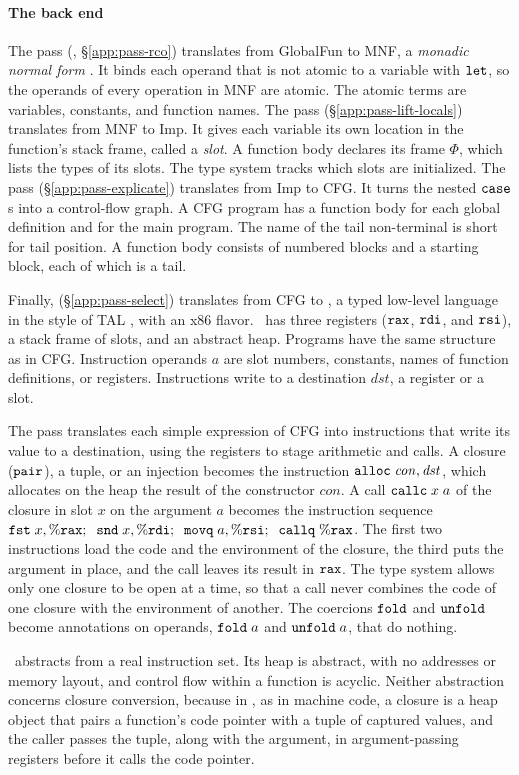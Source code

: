 \paragraph{The back end}

The pass  (,
\S\ref{app:pass-rco}) translates from GlobalFun to MNF, a
\emph{monadic normal form} \citep{Hatcliff:1994vn}. It binds each
operand that is not atomic to a variable with $\mathtt{let}$, so the
operands of every operation in MNF are atomic.  The atomic terms are
variables, constants, and function names.  The  pass
(\S\ref{app:pass-lift-locals}) translates from MNF to Imp. It gives
each variable its own location in the function's stack frame, called a
\emph{slot}. A function body declares its frame $\Phi$, which lists
the types of its slots. The type system tracks which slots are
initialized. The  pass
(\S\ref{app:pass-explicate}) translates from Imp to CFG. It turns the
nested $\mathtt{case}$s into a control-flow graph. A CFG program has a
function body for each global definition and for the main program.
The name of the tail non-terminal is short for tail position.  A
function body consists of numbered blocks and a starting block, each
of which is a tail.

Finally,  (\S\ref{app:pass-select})
translates from CFG to \instr, a typed low-level language in the style
of TAL \citep{Morrisett:1999fk}, with an x86 flavor.  \instr\ has
three registers ($\mathtt{rax}$, $\mathtt{rdi}$, and $\mathtt{rsi}$), a stack
frame of slots, and an abstract heap. Programs have the same structure
as in CFG. Instruction operands $a$ are slot numbers, constants, names
of function definitions, or registers. Instructions write to a
destination $\mathit{dst}$, a register or a slot.

The pass translates each simple expression of CFG into instructions
that write its value to a destination, using the registers to stage
arithmetic and calls. A closure ($\mathtt{pair}$), a tuple, or an
injection becomes the instruction $\mathtt{alloc}\;\mathit{con},
\mathit{dst}$, which allocates on the heap the result of the
constructor $\mathit{con}$. A call $\mathtt{callc}\;x\;a$ of the closure
in slot $x$ on the argument $a$ becomes the instruction sequence
$\mathtt{fst}\;x, \%\mathtt{rax};\;\; \mathtt{snd}\;x, \%\mathtt{rdi};\;\;
\mathtt{movq}\;a, \%\mathtt{rsi};\;\; \mathtt{callq}\;\%\mathtt{rax}$.  The first two
instructions load the code and the environment of the closure, the
third puts the argument in place, and the call leaves its result in
$\mathtt{rax}$. The type system allows only one closure to be open at a
time, so that a call never combines the code of one closure with the
environment of another. The coercions $\mathtt{fold}$ and $\mathtt{unfold}$
become annotations on operands, $\mathtt{fold}\;a$ and $\mathtt{unfold}\;a$,
that do nothing.

\instr\ abstracts from a real instruction set. Its heap is abstract,
with no addresses or memory layout, and control flow within a function
is acyclic. Neither abstraction concerns closure conversion, because
in \instr, as in machine code, a closure is a heap object that pairs a
function's code pointer with a tuple of captured values, and the
caller passes the tuple, along with the argument, in argument-passing
registers before it calls the code pointer.
